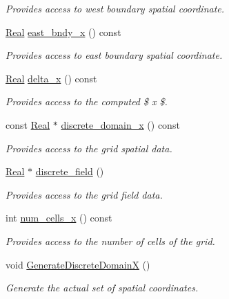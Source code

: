 \begin{DoxyCompactItemize}
\begin{DoxyCompactList}\small\item\em Provides access to west boundary spatial coordinate. \end{DoxyCompactList}\item 
\hyperlink{group__c01-roots_gac080bbbf5cbb5502c9f00405f894857d}{Real} \hyperlink{classmtk_1_1UniStgGrid1D_a3b413aeadcc3d3263f6817f3af1dee95}{east\+\_\+bndy\+\_\+x} () const 
\begin{DoxyCompactList}\small\item\em Provides access to east boundary spatial coordinate. \end{DoxyCompactList}\item 
\hyperlink{group__c01-roots_gac080bbbf5cbb5502c9f00405f894857d}{Real} \hyperlink{classmtk_1_1UniStgGrid1D_a6e7173b01241632cf509496d66b9f74c}{delta\+\_\+x} () const 
\begin{DoxyCompactList}\small\item\em Provides access to the computed \$  x \$. \end{DoxyCompactList}\item 
const \hyperlink{group__c01-roots_gac080bbbf5cbb5502c9f00405f894857d}{Real} $\ast$ \hyperlink{classmtk_1_1UniStgGrid1D_aa1999580cb98c19950e951510871cc90}{discrete\+\_\+domain\+\_\+x} () const 
\begin{DoxyCompactList}\small\item\em Provides access to the grid spatial data. \end{DoxyCompactList}\item 
\hyperlink{group__c01-roots_gac080bbbf5cbb5502c9f00405f894857d}{Real} $\ast$ \hyperlink{classmtk_1_1UniStgGrid1D_ab9c3f9ee2ac76a351b01e4abfede4d19}{discrete\+\_\+field} ()
\begin{DoxyCompactList}\small\item\em Provides access to the grid field data. \end{DoxyCompactList}\item 
int \hyperlink{classmtk_1_1UniStgGrid1D_af1b3729d8afa07be5b2775ed68015b80}{num\+\_\+cells\+\_\+x} () const 
\begin{DoxyCompactList}\small\item\em Provides access to the number of cells of the grid. \end{DoxyCompactList}\item 
void \hyperlink{classmtk_1_1UniStgGrid1D_a36a7a85e237a4f85c603eac8cf67a704}{Generate\+Discrete\+Domain\+X} ()
\begin{DoxyCompactList}\small\item\em Generate the actual set of spatial coordinates. \end{DoxyCompactList}\item 

\end{DoxyCompactItemize}
